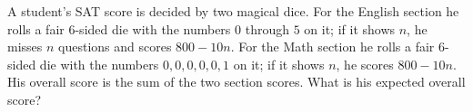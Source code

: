 A student's SAT score is decided by two magical dice. For the English section he rolls a fair $6$-sided die with the numbers $0$ through $5$ on it; if it shows $n$, he misses $n$ questions and scores $800-10n$. For the Math section he rolls a fair $6$-sided die with the numbers $0,0,0,0,0,1$ on it; if it shows $n$, he scores $800-10n$. His overall score is the sum of the two section scores. What is his expected overall score?
